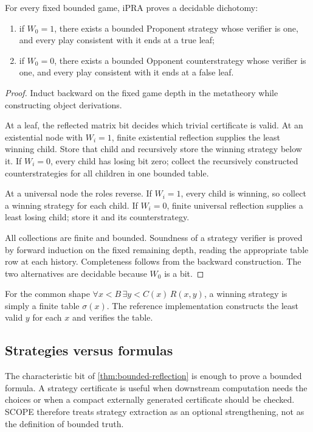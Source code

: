 \begin{theorem}
\label{thm:finite-strategy}
For every fixed bounded game, iPRA proves a decidable dichotomy:

\begin{enumerate}
\item if \(W_0=1\), there exists a bounded Proponent strategy whose verifier is one, and every play consistent with it ends at a true leaf;
\item if \(W_0=0\), there exists a bounded Opponent counterstrategy whose verifier is one, and every play consistent with it ends at a false leaf.
\end{enumerate}
\end{theorem}
\begin{proof}
Induct backward on the fixed game depth in the metatheory while constructing object derivations.

At a leaf, the reflected matrix bit decides which trivial certificate is valid.  At an existential node with \(W_i=1\), finite existential reflection supplies the least winning child.  Store that child and recursively store the winning strategy below it.  If \(W_i=0\), every child has losing bit zero; collect the recursively constructed counterstrategies for all children in one bounded table.

At a universal node the roles reverse.  If \(W_i=1\), every child is winning, so collect a winning strategy for each child.  If \(W_i=0\), finite universal reflection supplies a least losing child; store it and its counterstrategy.

All collections are finite and bounded.  Soundness of a strategy verifier is proved by forward induction on the fixed remaining depth, reading the appropriate table row at each history.  Completeness follows from the backward construction.  The two alternatives are decidable because \(W_0\) is a bit.
\end{proof}

For the common shape \(\forall x<B\,\exists y<C(x)\,R(x,y)\), a winning strategy is simply a finite table \(\sigma(x)\).  The reference implementation constructs the least valid \(y\) for each \(x\) and verifies the table.

\subsection{Strategies versus formulas}

The characteristic bit of \cref{thm:bounded-reflection} is enough to prove a bounded formula.  A strategy certificate is useful when downstream computation needs the choices or when a compact externally generated certificate should be checked.  SCOPE therefore treats strategy extraction as an optional strengthening, not as the definition of bounded truth.

